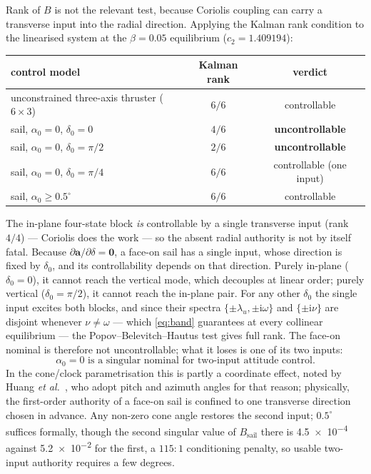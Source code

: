 \documentclass[pdflatex,sn-mathphys-num]{sn-jnl}
\begin{document}
Rank of $B$ is not the relevant test, because Coriolis coupling can carry a
transverse input into the radial direction. Applying the Kalman rank condition
to the linearised system at the $\beta=0.05$ equilibrium ($c_2=1.409194$):

\begin{center}
\begin{tabular}{lcc}
  \toprule
  control model & Kalman rank & verdict \\
  \midrule
  unconstrained three-axis thruster ($6\times3$) & $6/6$ & controllable \\
  sail, $\alpha_0=0$, $\delta_0=0$   & $4/6$ & \textbf{uncontrollable} \\
  sail, $\alpha_0=0$, $\delta_0=\pi/2$ & $2/6$ & \textbf{uncontrollable} \\
  sail, $\alpha_0=0$, $\delta_0=\pi/4$ & $6/6$ & controllable (one input) \\
  sail, $\alpha_0\geq0.5^\circ$      & $6/6$ & controllable \\
  \bottomrule
\end{tabular}
\end{center}

The in-plane four-state block \emph{is} controllable by a single transverse
input (rank $4/4$) --- Coriolis does the work --- so the absent radial authority
is not by itself fatal. Because $\partial\bm{a}/\partial\delta=\bm{0}$, a face-on sail has a single
input, whose direction is fixed by $\delta_0$, and its controllability depends
on that direction. Purely in-plane ($\delta_0=0$), it cannot reach the vertical
mode, which decouples at linear order; purely vertical ($\delta_0=\pi/2$), it
cannot reach the in-plane pair. For any other $\delta_0$ the single input
excites both blocks, and since their spectra $\{\pm\lambda_u,\pm\mathrm{i}\omega\}$
and $\{\pm\mathrm{i}\nu\}$ are disjoint whenever $\nu\neq\omega$ --- which
\eqref{eq:band} guarantees at every collinear equilibrium --- the
Popov--Belevitch--Hautus test gives full rank. The face-on nominal is therefore
not uncontrollable; what it loses is one of its two inputs:
\begin{equation}
  \alpha_0 = 0 \text{ is a singular nominal for two-input attitude control.}
\end{equation}
In the cone/clock parametrisation this is partly a coordinate effect, noted by
Huang \emph{et al.}~\cite{huang2020}, who adopt pitch and azimuth angles for that
reason; physically, the first-order authority of a face-on sail is confined to
one transverse direction chosen in advance. Any non-zero cone angle restores the
second input; $0.5^\circ$ suffices formally, though the second singular value
of $B_{\mathrm{sail}}$ there is \num{4.5e-4} against \num{5.2e-2} for the first,
a $115{:}1$ conditioning penalty, so usable two-input authority requires a few
degrees.
\end{document}
